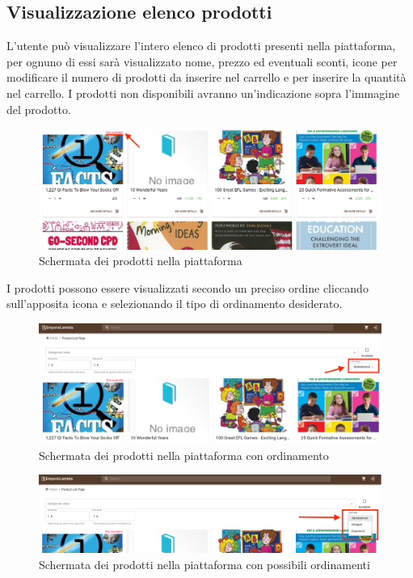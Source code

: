 \subsection{Visualizzazione elenco prodotti}
L'utente può visualizzare l'intero elenco di prodotti presenti nella piattaforma, per ognuno di essi sarà visualizzato nome, prezzo ed eventuali sconti, icone per modificare il numero di prodotti da inserire nel carrello e per inserire la quantità nel carrello. I prodotti non disponibili avranno un'indicazione sopra l'immagine del prodotto.
\begin{figure}[H]
	\centering
	\includegraphics[scale=0.25]{Immagini/Acquirente/plp-pagination.customer.png}
	\caption{Schermata dei prodotti nella piattaforma}
	\label{fig:PLP}
\end{figure}
I prodotti possono essere visualizzati secondo un preciso ordine cliccando sull'apposita icona e selezionando il tipo di ordinamento desiderato.
\begin{figure}[H]
	\centering
	\includegraphics[scale=0.25]{Immagini/Acquirente/plp-sort1.png}
	\caption{Schermata dei prodotti nella piattaforma con ordinamento}
	\label{fig:PLPordinamento1}
\end{figure}
\begin{figure}[H]
	\centering
	\includegraphics[scale=0.25]{Immagini/Acquirente/plp-sort-filter.png}
	\caption{Schermata dei prodotti nella piattaforma con possibili ordinamenti}
	\label{fig:PLPordinamento2}
\end{figure}
